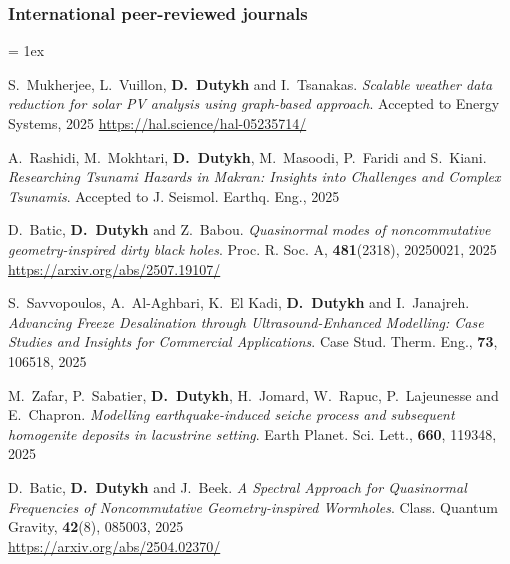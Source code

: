 \separator
\subsubsection{International peer-reviewed journals}

\listpartsep = 1ex

\begin{etaremune}

  

  \item S.~Mukherjee, L.~Vuillon, \textbf{D.~Dutykh} and I.~Tsanakas. \textit{Scalable weather data reduction for solar PV analysis using graph-based approach}. Accepted to Energy Systems, 2025 %
  \url{https://hal.science/hal-05235714/}

  \item A.~Rashidi, M.~Mokhtari, \textbf{D.~Dutykh}, M.~Masoodi, P.~Faridi and S.~Kiani. \textit{Researching Tsunami Hazards in Makran: Insights into Challenges and Complex Tsunamis}. Accepted to J. Seismol. Earthq. Eng., 2025 %

  \item D.~Batic, \textbf{D.~Dutykh} and Z.~Babou. \textit{Quasinormal modes of noncommutative geometry-inspired dirty black holes}. Proc. R. Soc. A, \textbf{481}(2318), 20250021, 2025 \\ %
  \url{https://arxiv.org/abs/2507.19107/}

  \item S.~Savvopoulos, A.~Al-Aghbari, K.~El Kadi, \textbf{D.~Dutykh} and I.~Janajreh. \textit{Advancing Freeze Desalination through Ultrasound-Enhanced Modelling: Case Studies and Insights for Commercial Applications}. Case Stud. Therm. Eng., \textbf{73}, 106518, 2025 %

  \item M.~Zafar, P.~Sabatier, \textbf{D.~Dutykh}, H.~Jomard, W.~Rapuc, P.~Lajeunesse and E.~Chapron. \textit{Modelling earthquake-induced seiche process and subsequent homogenite deposits in lacustrine setting}. Earth Planet. Sci. Lett., \textbf{660}, 119348, 2025 %

  \item D.~Batic, \textbf{D.~Dutykh} and J.~Beek. \textit{A Spectral Approach for Quasinormal Frequencies of Noncommutative Geometry-inspired Wormholes}. Class. Quantum Gravity, \textbf{42}(8), 085003, 2025 \\ %
  \url{https://arxiv.org/abs/2504.02370/}


\end{etaremune}
